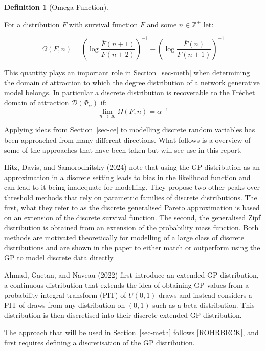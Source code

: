 \documentclass[
  10pt,
  a4paper,
]{scrreprt}
\theoremstyle{plain}
\theoremstyle{plain}
\theoremstyle{definition}
\newtheorem{definition}{Definition}[section]
\theoremstyle{plain}
\theoremstyle{remark}
\begin{document}
{\begin{definition}[Omega
Function]\protect\hypertarget{def-omega}{}\label{def-omega}

For a distribution \(F\) with survival function \(\overline F\) and some
\(n\in\mathbb Z^+\) let:

\[
\Omega(F,n) = \left(\log\displaystyle\frac{\overline F (n+1)}{\overline F (n+2)}\right)^{-1} - \left(\log\displaystyle\frac{\overline F (n)}{\overline F (n+1)}\right)^{-1}
\]

\end{definition}

This quantity plays an important role in Section~\ref{sec-meth} when
determining the domain of attraction to which the degree distribution of
a network generative model belongs. In particular a discrete
distribution is recoverable to the Fréchet domain of attraction
\(\mathcal D(\Phi_\alpha)\) if: \[
\lim_{n\rightarrow\infty}\Omega(F,n) = \alpha^{-1}
\]

Applying ideas from Section~\ref{sec-ce} to modelling discrete random
variables has been approached from many different directions. What
follows is a overview of some of the approaches that have been taken but
will see use in this report.

Hitz, Davis, and Samorodnitsky (2024) note that using the GP
distribution as an approximation in a discrete setting leads to bias in
the likelihood function and can lead to it being inadequate for
modelling. They propose two other peaks over threshold methods that rely
on parametric families of discrete distributions. The first, what they
refer to as the discrete generalised Pareto approximation is based on an
extension of the discrete survival function. The second, the generalised
Zipf distribution is obtained from an extension of the probability mass
function. Both methods are motivated theoretically for modelling of a
large class of discrete distributions and are shown in the paper to
either match or outperform using the GP to model discrete data directly.

Ahmad, Gaetan, and Naveau (2022) first introduce an extended GP
distribution, a continuous distribution that extends the idea of
obtaining GP values from a probability integral transform (PIT) of
\(U(0,1)\) draws and instead considers a PIT of draws from any
distribution on \((0,1)\) such as a beta distribution. This distribution
is then discretised into their discrete extended GP distribution.

The approach that will be used in Section~\ref{sec-meth} follows
{[}ROHRBECK{]}, and first requires defining a discretisation of the GP
distribution.

}
\end{document}
